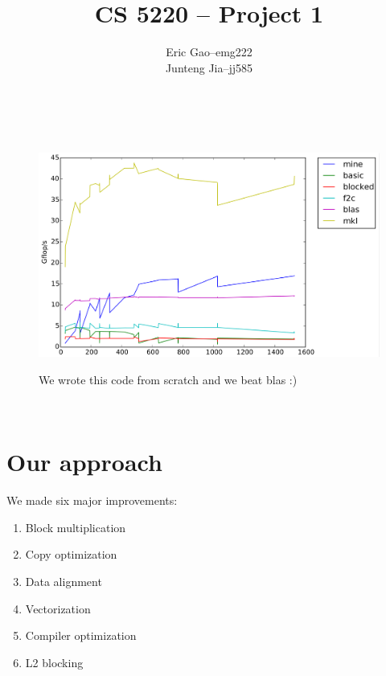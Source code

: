 \documentclass[11pt]{article}
\title{CS 5220 -- Project 1} %
\author{
  \begin{tabular}{l c l}
    Eric Gao & -- & emg222\\
    Junteng Jia & -- & jj585
  \end{tabular}\\
  \rule{\linewidth}{0.4pt}
}
\date{}
\begin{document}
    \thispagestyle{empty}
    \maketitle

    \vspace{1cm}

    \begin{figure}[H]
        \centering
        \includegraphics[width=6.5in]{timing_vector_32_64_cc_cp_align.png}
        
        \begin{center}
        We wrote this code from scratch and we beat blas :)         
        \end{center}
    \end{figure}


    \clearpage

    \tableofcontents\

    \pagebreak
    \section{Our approach}
    We made six major improvements:
     \begin{enumerate}
            \item Block multiplication
            \item Copy optimization
            \item Data alignment
            \item Vectorization
            \item Compiler optimization
            \item L2 blocking
     \end{enumerate}
    
        \vspace{1cm}
                
\end{document}
